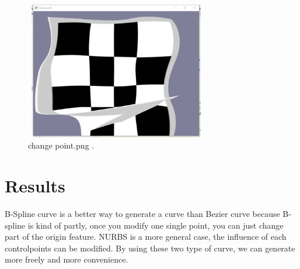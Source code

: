 \documentclass[acmtog]{acmart}
\begin{document}
\begin{figure}[h]
	\centering
	\includegraphics[width=8cm,height=6cm]{change point.png}
	\caption{change point.png .}
\end{figure}

\section{Results}
B-Spline curve is a better way to generate a curve than Bezier curve because B-spline is kind of partly, once you modify one single point, you can just change part of the origin feature. NURBS is a more general case, the influence of each controlpoints can be modified. By using these two type of curve, we can generate more freely and more convenience. 
\\\\
\end{document}
